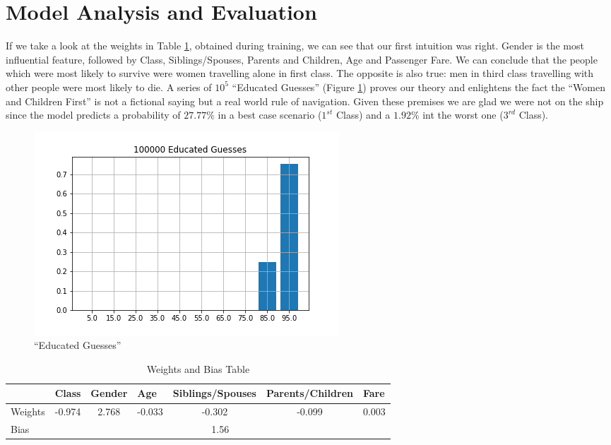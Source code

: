 \documentclass[10pt,a4paper]{report}
\begin{document}
\section{Model Analysis and Evaluation}
If we take a look at the weights in Table \ref{tab:1}, obtained during training, we can see that our first intuition was right. Gender is the most influential feature, followed by Class, Siblings/Spouses, Parents and Children, Age and Passenger Fare. We can conclude that the people which were most likely to survive were women travelling alone in first class. The opposite is also true: men in third class travelling with other people were most likely to die. A series of $10^5$ \enquote{Educated Guesses} (Figure \ref{fig:ed_guess}) proves our theory and enlightens the fact the \enquote{Women and Children First} is not a fictional saying but a real world rule of navigation. Given these premises we are glad we were not on the ship since the model predicts a probability of $27.77 \%$ in a best case scenario ($1^{st}$ Class) and a $1.92 \%$ int the worst one ($3^{rd}$ Class).
\begin{figure}[!ht]
\centering
\includegraphics[width=0.5\linewidth]{ed_guess.png}
\caption{\enquote{Educated Guesses}}
\label{fig:ed_guess}
\end{figure}
\begin{table}[!ht]
\centering
\begin{tabular}{|l|c|l|l|l|l|l|}
\hline
        & \multicolumn{1}{l|}{Class} & Gender                     & Age                         & Siblings/Spouses            & Parents/Children            & Fare                       \\ \hline
Weights & -0.974                     & \multicolumn{1}{c|}{2.768} & \multicolumn{1}{c|}{-0.033} & \multicolumn{1}{c|}{-0.302} & \multicolumn{1}{c|}{-0.099} & \multicolumn{1}{c|}{0.003} \\ \hline
Bias    & \multicolumn{6}{c|}{1.56}                                                                                                                                                      \\ \hline
\end{tabular}
\caption{Weights and Bias Table}
\label{tab:1}
\end{table} 
\end{document}
